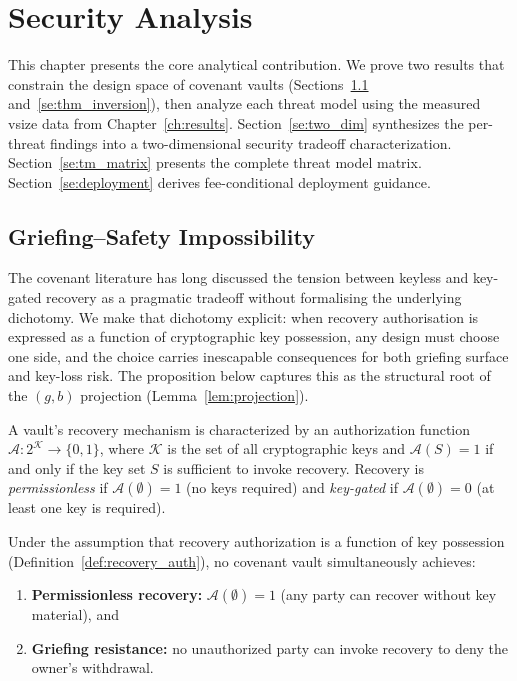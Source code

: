 \chapter{Security Analysis} \label{ch:security}

This chapter presents the core analytical contribution. We prove two results that
constrain the design space of covenant vaults (Sections~\ref{se:thm_griefing}
and~\ref{se:thm_inversion}), then analyze each threat model using the measured vsize
data from Chapter~\ref{ch:results}. Section~\ref{se:two_dim} synthesizes the
per-threat findings into a two-dimensional security tradeoff characterization.
Section~\ref{se:tm_matrix} presents the complete threat model matrix.
Section~\ref{se:deployment} derives fee-conditional deployment guidance.

\section{Griefing--Safety Impossibility} \label{se:thm_griefing}

The covenant literature has long discussed the tension between
keyless and key-gated recovery as a pragmatic tradeoff without
formalising the underlying dichotomy. We make that dichotomy
explicit: when recovery authorisation is expressed as a function of
cryptographic key possession, any design must choose one side, and
the choice carries inescapable consequences for both griefing
surface and key-loss risk. The proposition below captures this as
the structural root of the $(g, b)$ projection
(Lemma~\ref{lem:projection}).

\begin{definition} \label{def:recovery_auth}
A vault's recovery mechanism is characterized by an authorization function
$\mathcal{A}: 2^{\mathcal{K}} \rightarrow \{0,1\}$, where $\mathcal{K}$ is the
set of all cryptographic keys and $\mathcal{A}(S) = 1$ if and only if the key set
$S$ is sufficient to invoke recovery. Recovery is \emph{permissionless} if
$\mathcal{A}(\emptyset) = 1$ (no keys required) and \emph{key-gated} if
$\mathcal{A}(\emptyset) = 0$ (at least one key is required).
\end{definition}

\begin{proposition} \label{thm:griefing_safety}
Under the assumption that recovery authorization is a function of key possession
(Definition~\ref{def:recovery_auth}), no covenant vault simultaneously achieves:
\begin{enumerate}
  \item \textbf{Permissionless recovery:} $\mathcal{A}(\emptyset) = 1$
    (any party can recover without key material), and
  \item \textbf{Griefing resistance:} no unauthorized party can invoke recovery
    to deny the owner's withdrawal.
\end{enumerate}
\end{proposition}

